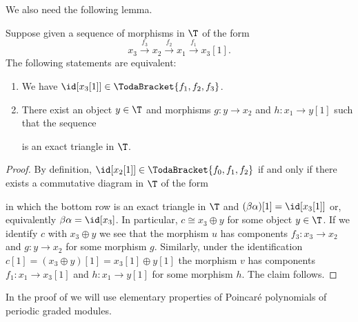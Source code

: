 \documentclass[a4paper]{amsart}
\begin{document}
We also need the following lemma.

\begin{lemma}
  \label{lemma:TodaBracket-3-id}
  Suppose given a sequence of morphisms in $\T$ of the form
  \[
    x_3\xrightarrow{f_3}x_2\xrightarrow{f_2}x_1\xrightarrow{f_1}x_3[1].
  \]
  The following statements are equivalent:
  \begin{enumerate}
  \item We have $\id[x_3[1]]\in\TodaBracket{f_1,f_2,f_3}$.
  \item There exist an object $y\in\T$ and morphisms $g\colon y\to x_2$ and
    $h\colon x_1\to y[1]$ such that the sequence
    \begin{center}
    \end{center}
    is an exact triangle in $\T$.
  \end{enumerate}
\end{lemma}
\begin{proof}
  By definition, $\id[x_2[1]]\in\TodaBracket{f_0,f_1,f_2}$ if and only if there
  exists a commutative diagram in $\T$ of the form
  \begin{center}
  \end{center}
  in which the bottom row is an exact triangle in $\T$ and
  $(\beta\alpha)[1]=\id[x_3[1]]$ or, equivalently $\beta\alpha=\id[x_3]$. In
  particular, $c\cong x_3\oplus y$ for some object $y\in\T$. If we identify $c$
  with $x_3\oplus y$ we see that the morphism $u$ has components $f_3\colon
  x_3\to x_2$ and $g\colon y\to x_2$ for some morphism $g$. Similarly, under the
  identification $c[1]=(x_3\oplus y)[1]=x_3[1]\oplus y[1]$ the morphism $v$ has
  components $f_1\colon x_1\to x_3[1]$ and $h\colon x_1\to y[1]$ for some
  morphism $h$. The claim follows.
\end{proof}

In the proof of  we will use elementary properties of Poincaré polynomials of periodic graded modules.
\end{document}
